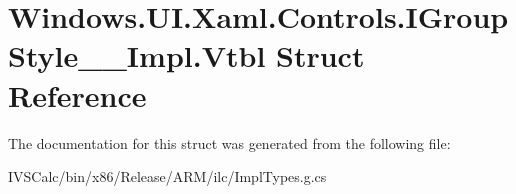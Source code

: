 \hypertarget{struct_windows_1_1_u_i_1_1_xaml_1_1_controls_1_1_i_group_style_____impl_1_1_vtbl}{}\section{Windows.\+U\+I.\+Xaml.\+Controls.\+I\+Group\+Style\+\_\+\+\_\+\+Impl.\+Vtbl Struct Reference}
\label{struct_windows_1_1_u_i_1_1_xaml_1_1_controls_1_1_i_group_style_____impl_1_1_vtbl}


The documentation for this struct was generated from the following file\+:\begin{DoxyCompactItemize}
\item 
I\+V\+S\+Calc/bin/x86/\+Release/\+A\+R\+M/ilc/Impl\+Types.\+g.\+cs\end{DoxyCompactItemize}
